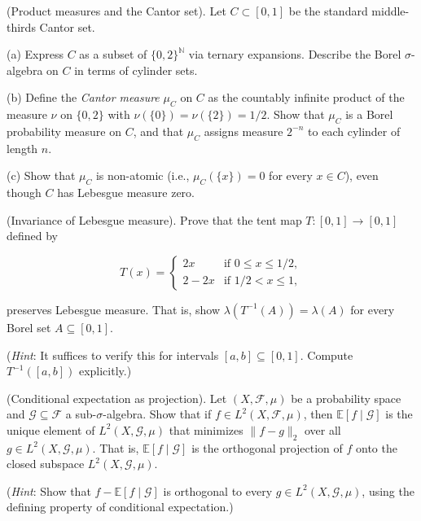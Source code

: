 \begin{exercise}
(Product measures and the Cantor set). Let $C \subset [0,1]$ be the standard middle-thirds Cantor set.

(a) Express $C$ as a subset of $\{0, 2\}^{\mathbb{N}}$ via ternary expansions. Describe the Borel $\sigma$-algebra on $C$ in terms of cylinder sets.

(b) Define the \textit{Cantor measure} $\mu_C$ on $C$ as the countably infinite product of the measure $\nu$ on $\{0, 2\}$ with $\nu(\{0\}) = \nu(\{2\}) = 1/2$. Show that $\mu_C$ is a Borel probability measure on $C$, and that $\mu_C$ assigns measure $2^{-n}$ to each cylinder of length $n$.

(c) Show that $\mu_C$ is non-atomic (i.e., $\mu_C(\{x\}) = 0$ for every $x \in C$), even though $C$ has Lebesgue measure zero.
\end{exercise}


\begin{exercise}
(Invariance of Lebesgue measure). Prove that the tent map $T: [0,1] \to [0,1]$ defined by

\[
T(x) = \begin{cases} 2x & \text{if } 0 \leq x \leq 1/2, \\ 2 - 2x & \text{if } 1/2 < x \leq 1, \end{cases}
\]

preserves Lebesgue measure. That is, show $\lambda(T^{-1}(A)) = \lambda(A)$ for every Borel set $A \subseteq [0,1]$.

(\textit{Hint}: It suffices to verify this for intervals $[a,b] \subseteq [0,1]$. Compute $T^{-1}([a,b])$ explicitly.)
\end{exercise}


\begin{exercise}
(Conditional expectation as projection). Let $(X, \mathcal{F}, \mu)$ be a probability space and $\mathcal{G} \subseteq \mathcal{F}$ a sub-$\sigma$-algebra. Show that if $f \in L^2(X, \mathcal{F}, \mu)$, then $\mathbb{E}[f \mid \mathcal{G}]$ is the unique element of $L^2(X, \mathcal{G}, \mu)$ that minimizes $\|f - g\|_2$ over all $g \in L^2(X, \mathcal{G}, \mu)$. That is, $\mathbb{E}[f \mid \mathcal{G}]$ is the orthogonal projection of $f$ onto the closed subspace $L^2(X, \mathcal{G}, \mu)$.

(\textit{Hint}: Show that $f - \mathbb{E}[f \mid \mathcal{G}]$ is orthogonal to every $g \in L^2(X, \mathcal{G}, \mu)$, using the defining property of conditional expectation.)
\end{exercise}


